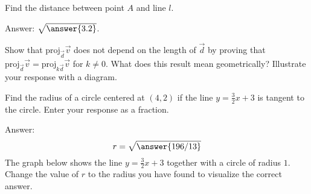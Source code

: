 \documentclass{ximera}
\begin{document}
\begin{problem}\label{prob:distpttoline}
Find the distance between point $A$ and line $l$.

\begin{center}
\end{center}

Answer: $\sqrt{\answer{3.2}}$.
\end{problem}
\begin{problem}\label{prob:proj3}
Show that $\mbox{proj}_{\vec{d}}\vec{v}$ does not depend on the length of $\vec{d}$ by proving that $\mbox{proj}_{\vec{d}}\vec{v}=\mbox{proj}_{k\vec{d}}\vec{v}$ for $k\neq 0$.  What does this result mean geometrically?  Illustrate your response with a diagram.
\end{problem}
\begin{problem}\label{prob:circletangenttoline}
Find the radius of a circle centered at $(4, 2)$ if the line $y=\frac{3}{2}x+3$ is tangent to the circle.  Enter your response as a fraction.

Answer:
$$r=\sqrt{\answer{196/13}}$$
The graph below shows the line $y=\frac{3}{2}x+3$ together with a circle of radius $1$.  Change the value of $r$ to the radius you have found to visualize the correct answer.

\begin{center} 
\end{center}



\end{problem}
\end{document}
